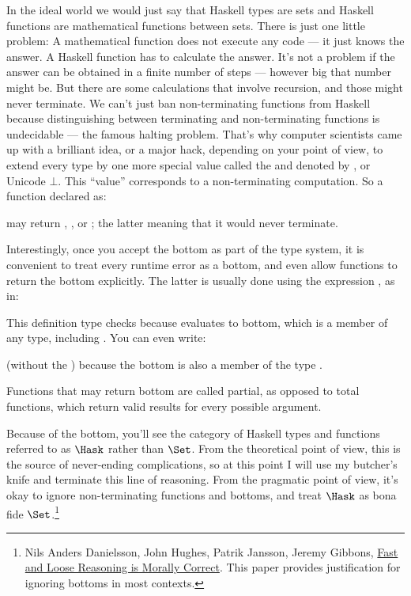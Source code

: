 In the ideal world we would just say that Haskell types are sets and
Haskell functions are mathematical functions between sets. There is just
one little problem: A mathematical function does not execute any code
--- it just knows the answer. A Haskell function has to calculate the
answer. It's not a problem if the answer can be obtained in a finite
number of steps --- however big that number might be. But there are some
calculations that involve recursion, and those might never terminate. We
can't just ban non-terminating functions from Haskell because
distinguishing between terminating and non-terminating functions is
undecidable --- the famous halting problem. That's why computer
scientists came up with a brilliant idea, or a major hack, depending on
your point of view, to extend every type by one more special value
called the  and denoted by \code{\_|\_}, or
Unicode $\bot$. This ``value'' corresponds to a non-terminating computation.
So a function declared as:

may return , , or \code{\_|\_};
the latter meaning that it would never terminate.

Interestingly, once you accept the bottom as part of the type system, it
is convenient to treat every runtime error as a bottom, and even allow
functions to return the bottom explicitly. The latter is usually done
using the expression , as in:

This definition type checks because  evaluates to
bottom, which is a member of any type, including . You can
even write:

(without the ) because the bottom is also a member of the type
.

Functions that may return bottom are called partial, as opposed to total
functions, which return valid results for every possible argument.

Because of the bottom, you'll see the category of Haskell types and
functions referred to as $\Hask$ rather than $\Set$. From
the theoretical point of view, this is the source of never-ending
complications, so at this point I will use my butcher's knife and
terminate this line of reasoning. From the pragmatic point of view, it's
okay to ignore non-terminating functions and bottoms, and treat
$\Hask$ as bona fide $\Set$.\footnote{Nils Anders Danielsson,
  John Hughes, Patrik Jansson, Jeremy Gibbons, \href{http://www.cs.ox.ac.uk/jeremy.gibbons/publications/fast+loose.pdf}{
    Fast and Loose Reasoning is Morally Correct}. This paper provides justification for ignoring bottoms in most contexts.}

